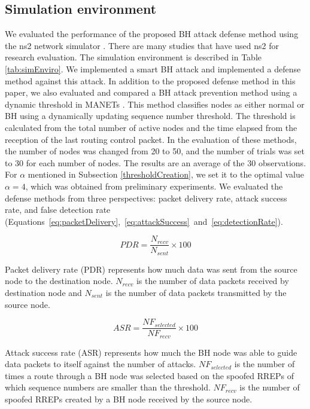 \documentclass[conference]{IEEEtran}
\begin{document}
\subsection{Simulation environment}
We evaluated the performance of the proposed BH attack defense method using the ns2 network simulator \cite{9}. There are many studies that have used ns2 for research evaluation. The simulation environment is described in Table \ref{tab:simEnviro}. We implemented a smart BH attack and implemented a defense method against this attack. In addition to the proposed defense method in this paper, we also evaluated and compared a BH attack prevention method using a dynamic threshold in MANETs \cite{3}. This method classifies nodes as either normal or BH using a dynamically updating sequence number threshold. The threshold is calculated from the total number of active nodes and the time elapsed from the reception of the last routing control packet. In the evaluation of these methods, the number of nodes was changed from 20 to 50, and the number of trials was set to 30 for each number of nodes. The results are an average of the 30 observations. For $\alpha$ mentioned in Subsection \ref{thresholdCreation}, we set it to the optimal value $\alpha = 4$, which was obtained from preliminary experiments. We evaluated the defense methods from three perspectives: packet delivery rate, attack success rate, and false detection rate \mbox{(Equations \ref{eq:packetDelivery}, \ref{eq:attackSuccess} and \ref{eq:detectionRate})}.

\begin{equation}
\label{eq:packetDelivery}
PDR=\displaystyle \frac{N_{recv}}{N_{sent}} \times 100 
\end{equation}

Packet delivery rate (PDR) represents how much data was sent from the source node to the destination node. $N_{recv}$ is the number of data packets received by destination node and $N_{sent}$ is the number of data packets transmitted by the source node.

\begin{equation}
\label{eq:attackSuccess}
ASR=\displaystyle \frac{{NF}_{selected}}{{NF}_{recv}} \times 100
\end{equation}

Attack success rate (ASR) represents how much the BH node was able to guide data packets to itself against the number of attacks. ${{NF}_{selected}}$ is the number of times a route through a BH node was selected based on the spoofed RREPs of which sequence numbers are smaller than the threshold. ${NF}_{recv}$ is the number of spoofed RREPs created by a BH node received by the source node.
\end{document}
